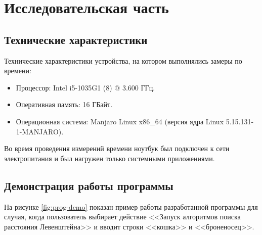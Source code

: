 \chapter{Исследовательская часть}

\section{Технические характеристики}

Технические характеристики устройства, на котором выполнялись замеры по времени:

\begin{itemize}
    \item Процессор: Intel i5-1035G1 (8) @ 3.600 ГГц.
    \item Оперативная память: 16 ГБайт.
    \item Операционная система: Manjaro Linux x86\_64 (версия ядра Linux 5.15.131-1-MANJARO).
\end{itemize}

Во время проведения измерений времени ноутбук был подключен к сети электропитания и был нагружен только системными приложениями.

\section{Демонстрация работы программы}

На рисунке \ref{fig:prog-demo} показан пример работы разработанной программы для случая, когда пользователь выбирает действие <<Запуск алгоритмов поиска расстояния Левенштейна>> и вводит строки <<кошка>> и <<броненосец>>.

